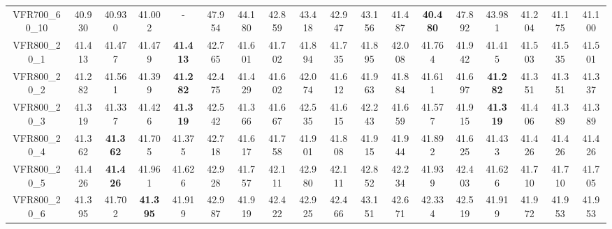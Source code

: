 \begin{tabular}{cc|ccc|ccccccccccccc}
VFR700\_60\_10     & 40.930           & 40.930           & 41.002           & -                & 47.954           & 44.180           & 42.859           & 43.418           & 42.947           & 43.156           & 41.487           & {\bf 40.480}     & 47.892           & 43.981           & 41.204           & 41.175           & 41.100          \\ 
VFR800\_20\_1      & 41.413           & 41.477           & 41.479           & {\bf 41.413}     & 42.765           & 41.601           & 41.702           & 41.894           & 41.735           & 41.895           & 42.008           & 41.764           & 41.942           & 41.415           & 41.503           & 41.535           & 41.501          \\ 
VFR800\_20\_2      & 41.282           & 41.561           & 41.399           & {\bf 41.282}     & 42.475           & 41.429           & 41.602           & 42.074           & 41.612           & 41.963           & 41.884           & 41.611           & 41.697           & {\bf 41.282}     & 41.351           & 41.351           & 41.337          \\ 
VFR800\_20\_3      & 41.319           & 41.337           & 41.426           & {\bf 41.319}     & 42.542           & 41.366           & 41.667           & 42.535           & 41.615           & 42.243           & 41.659           & 41.577           & 41.915           & {\bf 41.319}     & 41.406           & 41.389           & 41.389          \\ 
VFR800\_20\_4      & 41.362           & {\bf 41.362}     & 41.705           & 41.375           & 42.718           & 41.617           & 41.758           & 41.901           & 41.808           & 41.915           & 41.944           & 41.892           & 41.625           & 41.433           & 41.426           & 41.426           & 41.426          \\ 
VFR800\_20\_5      & 41.426           & {\bf 41.426}     & 41.961           & 41.626           & 42.928           & 41.757           & 42.111           & 42.980           & 42.111           & 42.852           & 42.234           & 41.939           & 42.403           & 41.626           & 41.710           & 41.710           & 41.705          \\ 
VFR800\_20\_6      & 41.395           & 41.702           & {\bf 41.395}     & 41.919           & 42.987           & 41.919           & 42.422           & 42.925           & 42.466           & 43.151           & 42.671           & 42.334           & 42.519           & 41.919           & 41.972           & 41.953           & 41.953          \\ 

\end{tabular}
